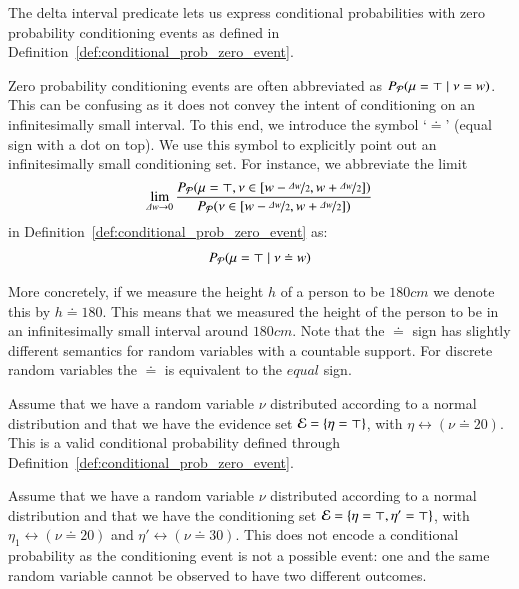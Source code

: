 The delta interval predicate lets us express conditional probabilities with zero probability conditioning events as defined in Definition~\ref{def:conditional_prob_zero_event}.

Zero probability conditioning events are often abbreviated as $P_\mathcal{P} (\mu=\top\mid \nu=w)$.
This can be confusing as it does not convey the intent of conditioning on an infinitesimally small interval. To this end, we introduce the symbol `$\doteq$' (equal sign with a dot on top). We use this symbol to explicitly point out an infinitesimally small conditioning set. For instance, we abbreviate the limit
\begin{align*}
    \lim_{\Delta w \rightarrow 0}
    \frac{P_\mathcal{P}(\mu=\top, \nu\in [w-\nicefrac{\Delta w}{2}, w+\nicefrac{\Delta w}{2} ]) }{P_\mathcal{P}(\nu \in [w-\nicefrac{\Delta w}{2}, w+\nicefrac{\Delta w}{2} ] )}
\end{align*}
in Definition~\ref{def:conditional_prob_zero_event} as:
\begin{align}
    P_\mathcal{P}(\mu=\top \mid \nu\doteq w )
\end{align}

More concretely, if we measure the height $h$ of a person to be $180cm$ we denote this by $h\doteq 180$. This means that we measured the height  of the person to be in an infinitesimally small interval around $180cm$. Note that the $\doteq$ sign has slightly different semantics for random variables with a countable support. For discrete random variables the $\doteq$ is equivalent to the $equal$ sign.



\begin{example} \label{ex:conditional_prob_zero}
    Assume that we have a random variable $\nu$ distributed according to a normal distribution and that we have the evidence set $\mathcal{E}= \{ \eta=\top \} $, with $\eta\leftrightarrow (\nu\doteq 20)$. This is a valid conditional probability defined through Definition~\ref{def:conditional_prob_zero_event}.
\end{example}


\begin{example}
    Assume that we have a random variable $\nu$ distributed according to a normal distribution and that we have the conditioning set $\mathcal{E}= \{ \eta=\top, \eta' = \top \} $, with $\eta_1\leftrightarrow (\nu\doteq 20)$ and $\eta'\leftrightarrow (\nu\doteq 30)$. This does not encode a conditional probability as the conditioning event is not a possible event: one and the same random variable cannot be observed to have two different outcomes.
\end{example}

